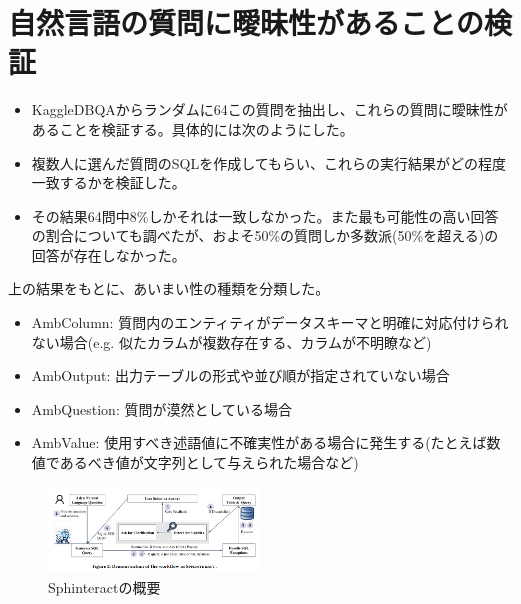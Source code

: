 \documentclass[dvipdfmx,uplatex]{jsarticle}
\theoremstyle{remark}
\newenvironment{simplebox}{
    \begin{tcolorbox}[
        fonttitle=\bfseries,
    ]
}{
    \end{tcolorbox}
}
\begin{document}
\section{自然言語の質問に曖昧性があることの検証}
\begin{simplebox}
\begin{itemize}
    \item KaggleDBQAからランダムに64この質問を抽出し、これらの質問に曖昧性があることを検証する。具体的には次のようにした。
    \item 複数人に選んだ質問のSQLを作成してもらい、これらの実行結果がどの程度一致するかを検証した。
    \item その結果64問中8\%しかそれは一致しなかった。また最も可能性の高い回答の割合についても調べたが、およそ50\%の質問しか多数派(50\%を超える)の回答が存在しなかった。
\end{itemize}
上の結果をもとに、あいまい性の種類を分類した。
\begin{itemize}
    \item AmbColumn: 質問内のエンティティがデータスキーマと明確に対応付けられない場合(e.g. 似たカラムが複数存在する、カラムが不明瞭など)
    \item AmbOutput: 出力テーブルの形式や並び順が指定されていない場合
    \item AmbQuestion: 質問が漠然としている場合
    \item AmbValue: 使用すべき述語値に不確実性がある場合に発生する(たとえば数値であるべき値が文字列として与えられた場合など)
\end{itemize}
\end{simplebox}

\begin{figure}
    \centering
    \includegraphics[width=0.5\textwidth]{img/sphinteract/overview.png}
    \caption{Sphinteractの概要}
    \label{fig:overview}
\end{figure}
\end{document}
